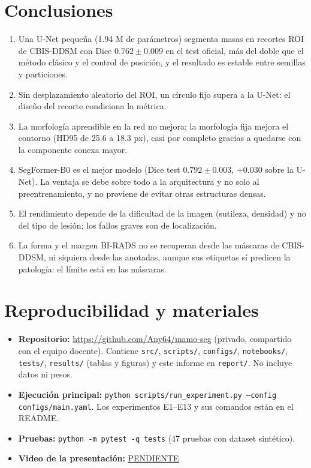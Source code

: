 \documentclass[11pt,a4paper]{article}
\begin{document}
\section{Conclusiones}
\begin{enumerate}
\item Una U-Net pequeña (1.94 M de parámetros) segmenta masas en recortes ROI de CBIS-DDSM con Dice $0.762 \pm 0.009$ en el test oficial, más del doble que el método clásico y el control de posición, y el resultado es estable entre semillas y particiones.
\item Sin desplazamiento aleatorio del ROI, un círculo fijo supera a la U-Net: el diseño del recorte condiciona la métrica.
\item La morfología aprendible en la red no mejora; la morfología fija mejora el contorno (HD95 de 25.6 a 18.3 px), casi por completo gracias a quedarse con la componente conexa mayor.
\item SegFormer-B0 es el mejor modelo (Dice test $0.792 \pm 0.003$, $+0.030$ sobre la U-Net). La ventaja se debe sobre todo a la arquitectura y no solo al preentrenamiento, y no proviene de evitar otras estructuras densas.
\item El rendimiento depende de la dificultad de la imagen (sutileza, densidad) y no del tipo de lesión; los fallos graves son de localización.
\item La forma y el margen BI-RADS no se recuperan desde las máscaras de CBIS-DDSM, ni siquiera desde las anotadas, aunque sus etiquetas sí predicen la patología: el límite está en las máscaras.
\end{enumerate}

\appendix
\section{Reproducibilidad y materiales}\label{sec:repro}
\begin{itemize}
\item \textbf{Repositorio:} \url{https://github.com/Any64/mamo-seg} (privado, compartido con el equipo docente). Contiene \texttt{src/}, \texttt{scripts/}, \texttt{configs/}, \texttt{notebooks/}, \texttt{tests/}, \texttt{results/} (tablas y figuras) y este informe en \texttt{report/}. No incluye datos ni pesos.
\item \textbf{Ejecución principal:} \texttt{python scripts/run\_experiment.py --config configs/main.yaml}. Los experimentos E1--E13 y sus comandos están en el README.
\item \textbf{Pruebas:} \texttt{python -m pytest -q tests} (47 pruebas con dataset sintético).
\item \textbf{Video de la presentación:} \url{PENDIENTE}
\end{itemize}



\end{document}
